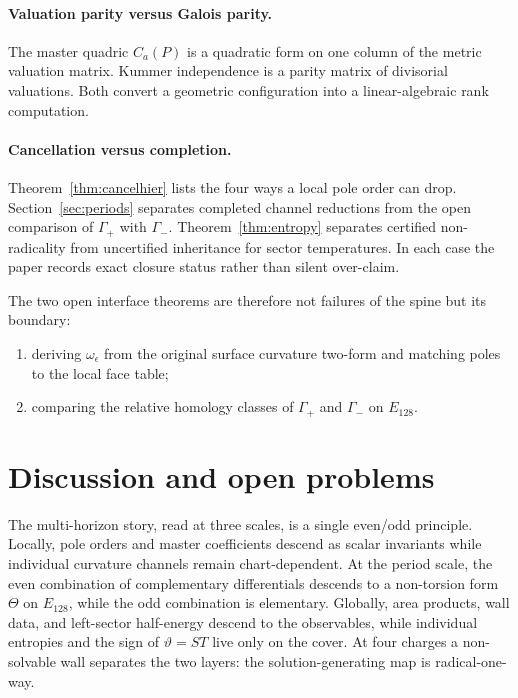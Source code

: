 \documentclass[11pt,a4paper]{article}
\theoremstyle{definition}
\theoremstyle{remark}
\begin{document}
\paragraph{Valuation parity versus Galois parity.}
The master quadric \(C_a(P)\) is a quadratic form on one column of the metric
valuation matrix. Kummer independence is a parity matrix of divisorial
valuations. Both convert a geometric configuration into a linear-algebraic
rank computation.

\paragraph{Cancellation versus completion.}
Theorem~\ref{thm:cancelhier} lists the four ways a local pole order can drop.
Section~\ref{sec:periods} separates completed channel reductions from the open
comparison of \(\Gamma_+\) with \(\Gamma_-\). Theorem~\ref{thm:entropy} separates
certified non-radicality from uncertified inheritance for sector temperatures.
In each case the paper records exact closure status rather than silent
over-claim.

The two open interface theorems are therefore not failures of the spine but
its boundary:
\begin{enumerate}
\item deriving \(\omega_\epsilon\) from the original surface curvature two-form
and matching poles to the local face table;
\item comparing the relative homology classes of \(\Gamma_+\) and \(\Gamma_-\)
on \(E_{128}\).
\end{enumerate}

\section{Discussion and open problems}
\label{sec:discussion}

The multi-horizon story, read at three scales, is a single even/odd principle.
Locally, pole orders and master coefficients descend as scalar invariants while
individual curvature channels remain chart-dependent. At the period scale, the
even combination of complementary differentials descends to a non-torsion form
\(\Theta\) on \(E_{128}\), while the odd combination is elementary. Globally,
area products, wall data, and left-sector half-energy descend to the
observables, while individual entropies and the sign of \(\vartheta=ST\) live
only on the cover. At four charges a non-solvable wall separates the two
layers: the solution-generating map is radical-one-way.
\end{document}
